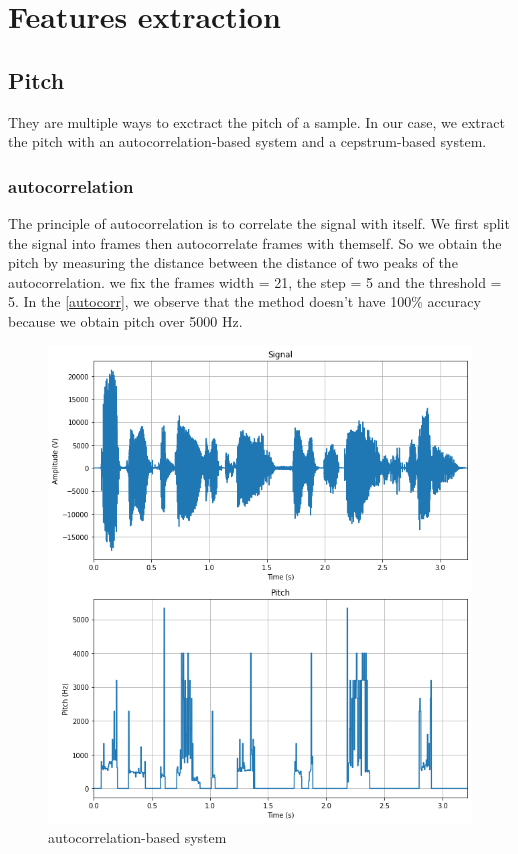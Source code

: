 \documentclass[]{article}
\begin{document}
\section{Features extraction}
\subsection{Pitch}
They are multiple ways to exctract the pitch of a sample. In our case, we extract the pitch with an autocorrelation-based
system and a cepstrum-based system.

\subsubsection{autocorrelation}
The principle of autocorrelation is to correlate the signal with itself. We first split the signal into frames then autocorrelate
frames with themself.
So we obtain the pitch by measuring the distance between the distance of two peaks of the autocorrelation. 
we fix the frames width = 21, the step = 5 and the threshold = 5. 
In the \autoref{autocorr}, we observe that the method doesn't have 100\% accuracy because we obtain pitch over 5000 Hz.

\begin{figure}[h]
    \centering
    \includegraphics[scale=0.5]{images/autocorr_pitch.png}
    \caption{\label{autocorr}autocorrelation-based system}
\end{figure}
\end{document}
